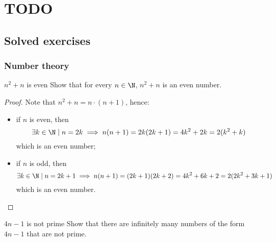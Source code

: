 \documentclass[a4paper, 12pt]{report}
\institute{\curlyquotes{\hspace{0.25mm}Sapienza} Università di Roma}
\subtitle{Appunti integrati con il libro \book}
\author{\textit{Autore}\\\authorName}
\institute{\curlyquotes{\hspace{0.25mm}Sapienza} University of Rome}
\subtitle{Lecture notes integrated with the book \book}
\author{\textit{Author}\\\authorName}
\title{\courseName}
\date{\today}
\begin{document}
    \maketitle

    {
        \hypersetup{allcolors=black}

        \romantableofcontents
    }

    \introduction


    \chapter{TODO}
    
    \section{Solved exercises}

    \subsection{Number theory}

    \begin{framedprob}{$n^2 + n$ is even}
        Show that for every $n \in \N$, $n^2 + n$ is an even number.
    \end{framedprob}

    \begin{proof}
        Note that $n^2 + n = n \cdot (n + 1)$, hence:

        \begin{itemize}
            \item if $n$ is even, then $$\exists k \in \N \mid n = 2k \implies n(n + 1) = 2k(2k + 1) =4k^2 + 2k = 2(k^2+k)$$ which is an even number;
            \item if $n$ is odd, then $$\exists k \in \N \mid n = 2k + 1 \implies n(n + 1) = (2k + 1)(2k + 2) = 4k^2 + 6k + 2 = 2(2k^2 + 3k +1)$$ which is an even number.
        \end{itemize}
    \end{proof}

    \begin{framedprob}{$4n -1$ is not prime}
        Show that there are infinitely many numbers of the form $4n -1$ that are not prime.
    \end{framedprob}
    
\end{document}
